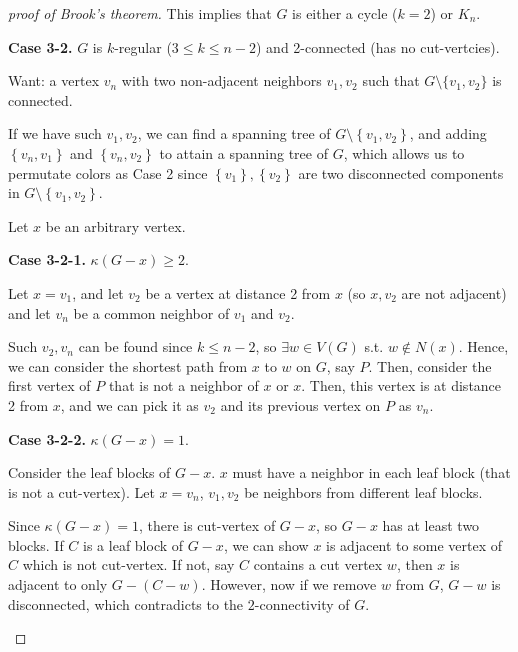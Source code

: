 \begin{proof}[proof of Brook's theorem]
    This implies that $G$ is either a cycle (\(k = 2\)) or \(K_n\).

    {\bf Case 3-2.} $G$ is $k$-regular ($3 \le k \le n-2$) and 2-connected (has no cut-vertcies).

    Want: a vertex $v_n$ with two non-adjacent neighbors $v_1,v_2$ such that $G\setminus\{v_1,v_2\}$ is connected.

    If we have such \(v_1, v_2\), we can find a spanning tree of \(G \setminus \left\{ v_1, v_2 \right\} \), and adding \(\left\{ v_n, v_1 \right\} \) and \(\left\{ v_n, v_2 \right\} \) to attain a spanning tree of \(G\), which allows us to permutate colors as Case 2 since \(\left\{ v_1 \right\}, \left\{ v_2 \right\}  \) are two disconnected components in \(G \setminus \left\{ v_1, v_2 \right\} \).      

    Let $x$ be an arbitrary vertex.

    {\bf Case 3-2-1.} $\kappa(G-x) \ge 2$.

    Let $x=v_1$, and let $v_2$ be a vertex at distance 2 from $x$ (so \(x, v_2\) are not adjacent) and let $v_n$ be a common neighbor of $v_1$ and $v_2$.

    \begin{remark}
        Such \(v_2, v_n\) can be found since \(k \le n - 2\), so \(\exists w \in V(G)\) s.t. \(w \notin N(x)\). Hence, we can consider the shortest path from \(x\) to \(w\) on \(G\), say \(P\). Then, consider the first vertex of \(P\) that is not a neighbor of \(x\) or \(x\). Then, this vertex is at distance 2 from \(x\), and we can pick it as \(v_2\) and its previous vertex on \(P\) as \(v_n\).             
    \end{remark}

    {\bf Case 3-2-2.} $\kappa(G-x) =1$.

    Consider the leaf blocks of $G-x$. $x$ must have a neighbor in each leaf block (that is not a cut-vertex). Let $x=v_n$, $v_1,v_2$ be neighbors from different leaf blocks.

    \begin{remark}
        Since \(\kappa (G - x) = 1\), there is cut-vertex of \(G - x\), so \(G - x\) has at least two blocks. If \(C\) is a leaf block of \(G - x\), we can show \(x\) is adjacent to some vertex of \(C\) which is not cut-vertex. If not, say \(C\) contains a cut vertex \(w\), then \(x\) is adjacent to only \(G - (C - w)\). However, now if we remove \(w\) from \(G\), \(G - w\) is disconnected, which contradicts to the \(2\)-connectivity of \(G\).              
    \end{remark}
\end{proof}